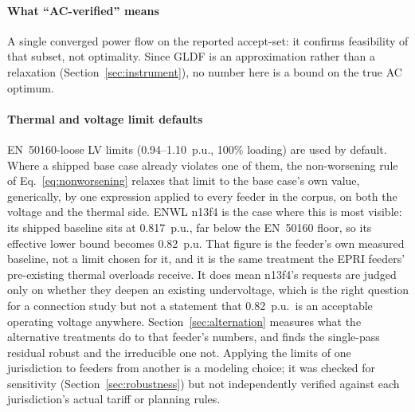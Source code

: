 \documentclass[review,authoryear,12pt]{elsarticle}
\begin{document}
\paragraph{What ``AC-verified'' means} A single converged power flow on the
reported accept-set: it confirms feasibility of that subset, not optimality.
Since GLDF is an approximation rather than a relaxation
(Section~\ref{sec:instrument}), no number here is a bound on the true AC
optimum.

\paragraph{Thermal and voltage limit defaults} EN~50160-loose LV limits
(0.94--1.10~p.u., 100\% loading) are used by default. Where a shipped base case
already violates one of them, the non-worsening rule of
Eq.~\eqref{eq:nonworsening} relaxes that limit to the base case's own value,
generically, by one expression applied to every feeder in the corpus, on both
the voltage and the thermal side. ENWL n13f4 is the case where this is most
visible: its shipped baseline sits at 0.817~p.u., far below the EN~50160 floor,
so its effective lower bound becomes 0.82~p.u. That figure is the feeder's own
measured baseline, not a limit chosen for it, and it is the same treatment the
EPRI feeders' pre-existing thermal overloads receive. It does mean n13f4's
requests are judged only on whether they deepen an existing undervoltage, which
is the right question for a connection study but not a statement that
0.82~p.u.\ is an acceptable operating voltage anywhere.
Section~\ref{sec:alternation} measures what the alternative treatments do to
that feeder's numbers, and finds the single-pass residual robust and the
irreducible one not. Applying the limits of
one jurisdiction to feeders from another is a modeling choice; it was checked
for sensitivity (Section~\ref{sec:robustness}) but not independently verified
against each jurisdiction's actual tariff or planning rules.
\end{document}
